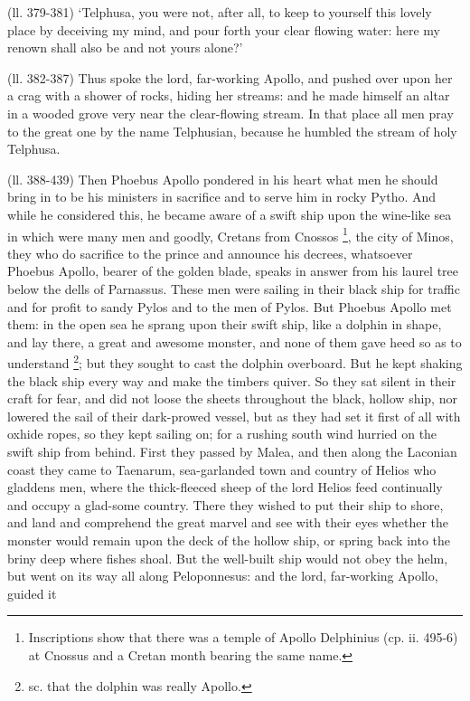 (ll. 379-381) ‘Telphusa, you were not, after all, to keep to yourself
this lovely place by deceiving my mind, and pour forth your clear flowing
water: here my renown shall also be and not yours alone?’

(ll. 382-387) Thus spoke the lord, far-working Apollo, and pushed over upon her
a crag with a shower of rocks, hiding her streams: and he made himself an altar
in a wooded grove very near the clear-flowing stream. In that place all men
pray to the great one by the name Telphusian, because he humbled the stream of
holy Telphusa.

(ll. 388-439) Then Phoebus Apollo pondered in his heart what men he should
bring in to be his ministers in sacrifice and to serve him in rocky Pytho. And
while he considered this, he became aware of a swift ship upon the wine-like
sea in which were many men and goodly, Cretans from Cnossos \footnote{Inscriptions show that
there was a temple of Apollo Delphinius (cp. ii. 495-6) at Cnossus and a Cretan
month bearing the same name.}, the city of Minos, they who do
sacrifice to the prince and announce his decrees, whatsoever Phoebus Apollo,
bearer of the golden blade, speaks in answer from his laurel tree below the
dells of Parnassus. These men were sailing in their black ship for traffic and
for profit to sandy Pylos and to the men of Pylos. But Phoebus Apollo met them:
in the open sea he sprang upon their swift ship, like a dolphin in shape, and
lay there, a great and awesome monster, and none of them gave heed so as to
understand \footnote{sc. that the dolphin was
really Apollo.}; but they sought to cast the
dolphin overboard. But he kept shaking the black ship every way and make the
timbers quiver. So they sat silent in their craft for fear, and did not loose
the sheets throughout the black, hollow ship, nor lowered the sail of their
dark-prowed vessel, but as they had set it first of all with oxhide ropes, so
they kept sailing on; for a rushing south wind hurried on the swift ship from
behind. First they passed by Malea, and then along the Laconian coast they came
to Taenarum, sea-garlanded town and country of Helios who gladdens men, where
the thick-fleeced sheep of the lord Helios feed continually and occupy a
glad-some country. There they wished to put their ship to shore, and land and
comprehend the great marvel and see with their eyes whether the monster would
remain upon the deck of the hollow ship, or spring back into the briny deep
where fishes shoal. But the well-built ship would not obey the helm, but went
on its way all along Peloponnesus: and the lord, far-working Apollo, guided it

